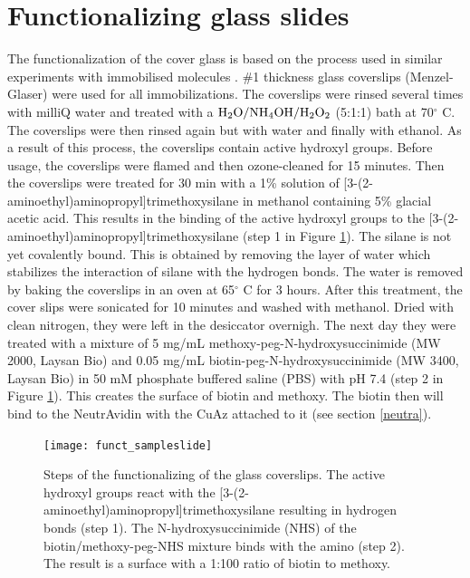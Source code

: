 \documentclass[twoside,single]{lion-msc}
\begin{document}
\section*{Functionalizing glass slides}\label{functio}
The functionalization of the cover glass is based on the process used in similar experiments with immobilised molecules \cite{Gupta2014}\cite{Zimmermann2010}\cite{Hu2001}\cite{Halliwell2001}.  \diameter 25mm \#1 thickness glass coverslips (Menzel-Glaser) were used for all immobilizations. The coverslips were rinsed several times with milliQ water and treated with a  $\textup{H}_{2}\textup{O} / \textup{NH}_{4}\textup{OH} / \textup{H}_{2}\textup{O}_{2}$ (5:1:1) bath at 70$^{\circ}$ C. The coverslips were then rinsed again but with water and finally with ethanol. As a result of this process, the coverslips contain active hydroxyl groups. Before usage, the coverslips were flamed and then ozone-cleaned for 15 minutes. Then the coverslips were treated for 30 min with a 1\% solution of [3-(2-aminoethyl)aminopropyl]trimethoxysilane in methanol containing 5\% glacial acetic acid. This results in the binding of the active hydroxyl groups to the [3-(2-aminoethyl)aminopropyl]trimethoxysilane (step 1 in Figure \ref{func}). The silane is not yet covalently bound. This is obtained by removing the layer of water which stabilizes the interaction of silane with the hydrogen bonds. The water is removed by baking the coverslips in an oven at 65$^{\circ}$ C for 3 hours. After this treatment, the cover slips were sonicated for 10 minutes and washed with methanol. Dried with clean nitrogen, they were left in the desiccator overnigh. The next day they were treated with a mixture of 5 mg/mL methoxy-peg-N-hydroxysuccinimide (MW 2000, Laysan Bio) and 0.05 mg/mL biotin-peg-N-hydroxysuccinimide (MW 3400, Laysan Bio) in 50 mM phosphate buffered saline (PBS)  with pH 7.4 (step 2 in Figure \ref{func}). 
This creates the surface of biotin and methoxy. The biotin then will bind to the NeutrAvidin with the CuAz attached to it (see section \ref{neutra}). 

\begin{figure}[ht!]
\centering
\texttt{[image: funct\_sampleslide]}
\caption{Steps of the functionalizing of the glass coverslips. The active hydroxyl groups react with the [3-(2-aminoethyl)aminopropyl]trimethoxysilane resulting in hydrogen bonds (step 1). The N-hydroxysuccinimide (NHS) of the biotin/methoxy-peg-NHS mixture binds with the amino (step 2). The result is a surface with a 1:100 ratio of biotin to methoxy.}
\label{func}
\end{figure}
\end{document}
